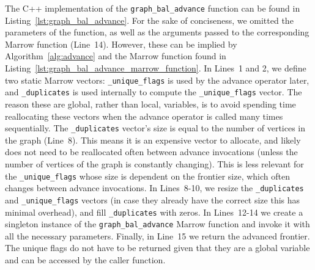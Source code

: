 

The C++ implementation of the \texttt{graph\_bal\_advance} function can be found in Listing~\ref{lst:graph_bal_advance}. For the sake of conciseness, we omitted the parameters of the function, as well as the arguments passed to the corresponding Marrow function (Line~14). However, these can be implied by  Algorithm~\ref{alg:advance} and the Marrow function found in Listing~\ref{lst:graph_bal_advance_marrow_function}. In Lines~1 and 2, we define two static Marrow vectors: \texttt{\_unique\_flags}  is used by the advance operator later, and  \texttt{\_duplicates}   is used internally to compute the \texttt{\_unique\_flags} vector. The reason these are global, rather than local, variables, is to avoid spending time reallocating these vectors when the advance operator is called many times sequentially. The \texttt{\_duplicates} vector's size is equal to the number of vertices in the graph (Line~8). This means it is an expensive vector to allocate, and likely does not need to be reallocated often between advance invocations (unless the number of vertices of the graph is constantly changing). This is less relevant for the \texttt{\_unique\_flags} whose size is dependent on the frontier size, which often changes between advance invocations. In Lines~8-10, we resize the \texttt{\_duplicates} and \texttt{\_unique\_flags} vectors (in case they already have the correct size this has minimal overhead), and fill \texttt{\_duplicates} with zeros. In Lines~12-14 we create a singleton instance of the \texttt{graph\_bal\_advance} Marrow function and invoke it with all the necessary parameters. Finally, in Line~15 we return the advanced frontier. The unique flags do not have to be returned given that they are a global variable and can be accessed by the caller function. 





